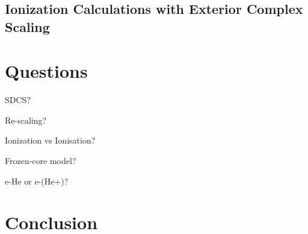 \documentclass[draft]{article}
\begin{document}
\subsection{Ionization Calculations with Exterior Complex Scaling}

\section{Questions}

SDCS?

Re-scaling?

Ionization vs Ionisation?

Frozen-core model?

e-He or e-(He+)?

\section{Conclusion}
\label{sec:conclusion}

\clearpage



\end{document}
